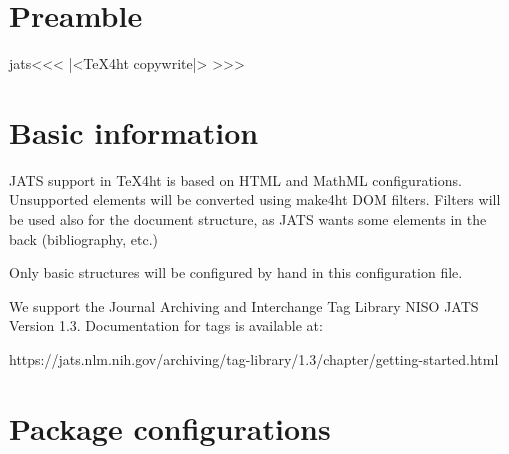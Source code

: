 %


\ifx \HTML\UnDef
   \def\HTML{jats}                   
   \def\CONFIG{\jobname}
   \def\MAKETITLE{\author{Eitan M. Gurari}}         
   \def\next{  \endinput}
   \expandafter\next
\fi




\chapter{Preamble}

\<jats\><<<
|<TeX4ht copywrite|>
>>>

  
\chapter{Basic information}

JATS support in TeX4ht is based on HTML and MathML configurations. 
Unsupported elements will be converted using make4ht DOM filters. 
Filters will be used also for the document structure, as JATS wants some
elements in the back (bibliography, etc.)

Only basic structures will be configured by hand in this configuration 
file.

We support the Journal Archiving and Interchange Tag Library NISO JATS 
Version 1.3. Documentation for tags is available at:

https://jats.nlm.nih.gov/archiving/tag-library/1.3/chapter/getting-started.html
\EndLink




\chapter{Package configurations}

